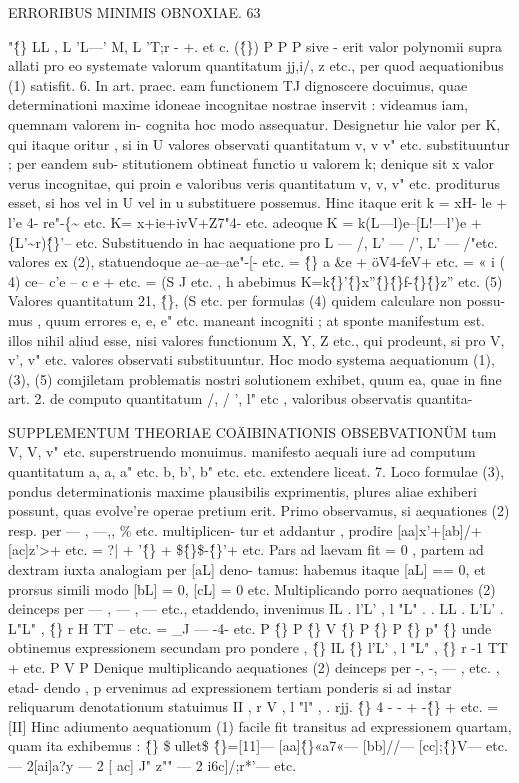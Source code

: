 \documentclass[12pt,a4paper]{article}
\begin{document}
\newpage
\begin{center}
\textsc{ERRORIBUS MINIMIS OBNOXIAE. 63}
\end{center}
"\^\{\} LL , L 'L---' M, L 'T;r - +. et c. (\^\{\})
P P P
sive - erit valor polynomii supra allati pro eo systemate valorum quantitatum
jj,i/, z etc., per quod aequationibus (1) satisfit.
6.
In art. praec. eam functionem TJ dignoscere docuimus, quae determinationi
maxime idoneae incognitae nostrae inservit : videamus iam, quemnam valorem in-
cognita hoc modo assequatur. Designetur hie valor per K, qui itaque oritur , si
in U valores observati quantitatum v, v v" etc. substituuntur ; per eandem sub-
stitutionem obtineat functio u valorem k; denique sit x valor verus incognitae,
qui proin e valoribus veris quantitatum v, v, v" etc. proditurus esset, si hos vel
in U vel in u substituere possemus. Hinc itaque erit
k = xH- le + l'e 4- re"-\{\~{} etc.
K= x+ie+ivV+Z7"4- etc.
adeoque
K = k(L---l)e--[L!---l')e + \{L'\~{}r)\^\{\}'-- etc.
Substituendo in hac aequatione pro L --- /, L' --- /', L' --- /"etc. valores ex (2),
statuendoque
ae--ae--ae"-[- etc. = \^\{\} a
\&e + öV4-feV+ etc. = « i ( 4)
ce-- c'e -- c e + etc. = (S J
etc. , h abebimus
K=k\^\{\}'\^\{\}x''\^\{\}\^\{\}f-\^\{\}\^\{\}z'' etc. (5)
Valores quantitatum 21, \^\{\}, (S etc. per formulas (4) quidem calculare non possu-
mus , quum errores e, e, e" etc. maneant incogniti ; at sponte manifestum est.
illos nihil aliud esse, nisi valores functionum X, Y, Z etc., qui prodeunt, si pro
V, v', v" etc. valores observati substituuntur. Hoc modo systema aequationum
(1), (3), (5) comjiletam problematis nostri solutionem exhibet, quum ea, quae in
fine art. 2. de computo quantitatum /, / ', l" etc , valoribus observatis quantita-

 SUPPLEMENTUM THEORIAE COÄIBINATIONIS OBSEBVATIONÜM
tum V, V, v" etc. superstruendo monuimus. manifesto aequali iure ad computum
quantitatum a, a, a" etc. b, b', b" etc. etc. extendere liceat.
7.
Loco formulae (3), pondus determinationis maxime plausibilis exprimentis,
plures aliae exhiberi possunt, quas evolve're operae pretium erit.
Primo observamus, si aequationes (2) resp. per --- , ---,, \% etc. multiplicen-
tur et addantur , prodire
[aa]x'+[ab]/+[ac]z'>+ etc. = ?| + '\^\{\} + \$\^\{\}\circ\$-\^\{\}'+ etc.
Pars ad laevam fit = 0 , partem ad dextram iuxta analogiam per [aL] deno-
tamus: habemus itaque
[aL] == 0, et prorsus simili modo [bL] = 0, [cL] = 0 etc.
Multiplicando porro aequationes (2) deinceps per --- , --- , --- etc., etaddendo,
invenimus
IL . l'L' , l "L" . . LL . L'L' . L"L" , \^\{\}
r H TT -- etc. = \_J --- -4- etc.
P \^\{\} P \^\{\} V \^\{\} P \^\{\} P \^\{\} p" \^\{\}
unde obtinemus expressionem secundam pro pondere ,
\^\{\} IL \^\{\} l'L' , l "L" , \^\{\}
r -1 TT + etc.
P V P
Denique multiplicando aequationes (2) deinceps per -, -, --- , etc. , etad-
dendo , p ervenimus ad expressionem tertiam ponderis
si ad instar reliquarum denotationum statuimus
II , r V , l "l" , . rjj.
\^\{\} 4 - - + -\^\{\} + etc. = [II]
Hinc adiumento aequationum (1) facile fit transitus ad expressionem quartam, quam
ita exhibemus : \^\{\} \$ullet\$
\^\{\}=[11]--- [aa]\^\{\}«a7«--- [bb]//--- [cc];\^\{\}V--- etc.
--- 2[ai]a?y --- 2 [ ac] J" z"" --- 2 i6c]/;r*'--- etc.
\end{document}
